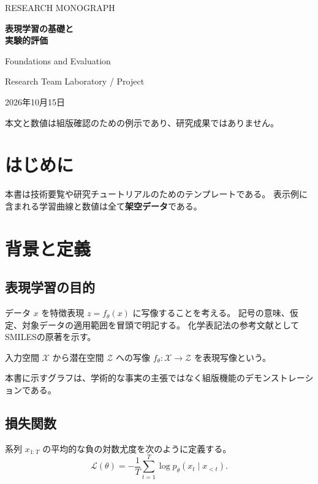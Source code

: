 \documentclass[11pt,a4paper,oneside,openany]{ltjsbook}
\begin{document}
\begin{titlepage}
\centering
\vspace*{42mm}
{\sffamily\large\color{researchteal} RESEARCH MONOGRAPH \par}
\vspace{12mm}
{\sffamily\bfseries\fontsize{25}{33}\selectfont\color{researchnavy}表現学習の基礎と\\[4mm]実験的評価\par}
\vspace{12mm}
{\Large Foundations and Evaluation\par}
\vfill
{\large Research Team \quad Laboratory / Project\par}
\vspace{8mm}
{\large 2026年10月15日\par}
\vspace{5mm}
{\color{researchgray}\small 本文と数値は組版確認のための例示であり、研究成果ではありません。\par}
\end{titlepage}
\frontmatter
\chapter*{はじめに}
本書は技術要覧や研究チュートリアルのためのテンプレートである。
表示例に含まれる学習曲線と数値は全て\textbf{架空データ}である。
\tableofcontents
\mainmatter
\chapter{背景と定義}
\section{表現学習の目的}
データ $x$ を特徴表現 $z=f_\theta(x)$ に写像することを考える。
記号の意味、仮定、対象データの適用範囲を冒頭で明記する。
化学表記法の参考文献としてSMILESの原著\cite{weininger1988smiles}を示す。
\begin{definition}[表現写像]
入力空間 $\mathcal{X}$ から潜在空間 $\mathcal{Z}$ への写像 $f_\theta:\mathcal{X}\to\mathcal{Z}$ を表現写像という。
\end{definition}
\begin{researchnote}[title={読み進める際の注意}]
本書に示すグラフは、学術的な事実の主張ではなく組版機能のデモンストレーションである。
\end{researchnote}
\section{損失関数}
系列 $x_{1:T}$ の平均的な負の対数尤度を次のように定義する。
\begin{equation}\label{eq:loss}
\mathcal{L}(\theta)=-\frac{1}{T}\sum_{t=1}^T\log p_\theta(x_t\mid x_{<t}).
\end{equation}
\end{document}
